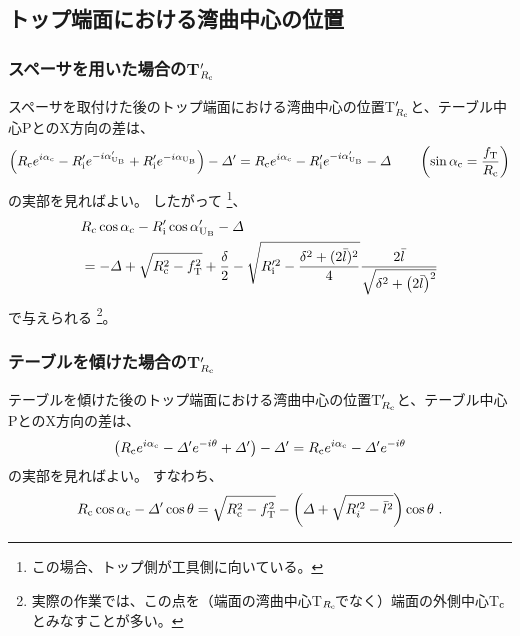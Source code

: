 \subsection{トップ端面における湾曲中心の位置}


\subsubsection{スペーサを用いた場合のT$_{R_\text c}'$}
スペーサを取付けた後のトップ端面における湾曲中心の位置T$_{R_\text c}'$と、テーブル中心PとのX方向の差は、
\begin{align*}
  \left(
    R_\text ce^{i\alpha_\text c}-R_\text i'e^{-i\alpha'_{\text U_\text B}}+R_\text i'e^{-i\alpha_{\text U_\text B}}
  \right)
  -\varDelta'
  = R_\text ce^{i\alpha_\text c}-R_\text i'e^{-i\alpha'_{\text U_\text B}}-\varDelta \qquad
    \left(\sin\alpha_\text c = \frac{f_\text T}{R_\text c}\right)
\end{align*}
の実部を見ればよい。
したがって
\footnote{この場合、トップ側が工具側に向いている。}、
\begin{align}
  \notag
  &  R_\text c\cos\alpha_\text c-R_\text i'\cos\alpha'_{\text U_\text B}-\varDelta\\
  &= -\varDelta+\sqrt{R_\text c^2-f_\text T^2}+\frac\delta2
     -\sqrt{R_\text i'^2-\frac{\delta^2+(2\bar l)^2}4}\frac{2\bar l}{\sqrt{\delta^2+\left(2\bar l\right)^2}}
     \label{eq:spacerTRc}
\end{align}
で与えられる
\footnote{実際の作業では、この点を（端面の湾曲中心T$_{R_\text c}\!$でなく）端面の外側中心T$_\text c$とみなすことが多い。}。


\subsubsection{テーブルを傾けた場合のT$_{R_\text c}'$}
テーブルを傾けた後のトップ端面における湾曲中心の位置T$_{R_\text c}'$と、テーブル中心PとのX方向の差は、
\begin{align*}
  \left(R_\text ce^{i\alpha_\text c}-\varDelta'e^{-i\theta}+\varDelta'\right)-\varDelta'
  = R_\text ce^{i\alpha_\text c}-\varDelta'e^{-i\theta}
\end{align*}
の実部を見ればよい。
すなわち、
\begin{align}
  \label{eq:tableTRc}
  R_\text c\cos\alpha_\text c-\varDelta'\cos\theta
  = \sqrt{R_\text c^2-f_\text T^2}-\left(\varDelta+\sqrt{R_i'^2-\bar l^2}\right)\cos\theta~.
\end{align}



